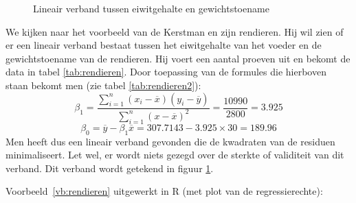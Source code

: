 \begin{figure}

  \caption{Lineair verband tussen eiwitgehalte en gewichtstoename}
  \label{fig:rendierenFiguur}
\end{figure}

\begin{example}
  \label{vb:rendieren}
  We kijken naar het voorbeeld van de Kerstman en zijn rendieren. Hij wil zien of er een lineair verband bestaat tussen het eiwitgehalte van het voeder en de gewichtstoename van de rendieren. Hij voert een aantal proeven uit en bekomt de data in tabel \ref{tab:rendieren}. Door toepassing van de formules die hierboven staan bekomt men (zie tabel \ref{tab:rendieren2}):
  \[ \beta_{1} = \frac{\sum_{i=1}^{n} (x_{i}-\overline{x})(y_{i} - \overline{y})}{\sum_{i=1}^{n} (x-\overline{x})^{2}} = \frac{10990}{2800} = 3.925 \]
  \[ \beta_{0} = \overline{y} - \beta_{1} \overline{x} = 307.7143 - 3.925 \times 30 = 189.96 \]
  Men heeft dus een lineair verband gevonden die de kwadraten van de residuen minimaliseert. Let wel, er wordt niets gezegd over de sterkte of validiteit van dit verband. Dit verband wordt getekend in figuur \ref{fig:rendierenFiguur}.
\end{example}

Voorbeeld~\ref{vb:rendieren} uitgewerkt in R (met plot van de regressierechte):




